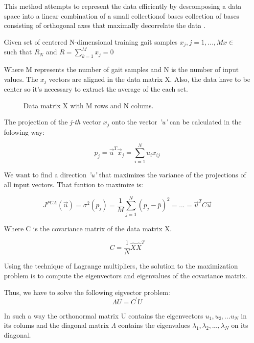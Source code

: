 This method attempts to represent the data efficiently by descomposing a data space into a linear combination of a small collectionof bases collection of bases consisting of orthogonal axes that maximally decorrelate the data \cite{Jeon}.

Given  set of centered N-dimensional training gait samples 
$ x_{j}, j=1,...,M     x \in$ such that $ R_{N} $ and $ R=\sum_{k=1}^{M}x_{j}=0 $
	
Where M represents the number of gait samples and N is the number of input values. The $ x_{j} $ vectors are aligned in the data matrix X. Also, the data have to be center so it's necessary to extract the average of the each set.
\begin{figure}[H]
	\centering
	\caption{Data matrix X with M rows and N colums.}
	\label{fig:matrixPCA}
\end{figure}

The projection of the \textit{j-th} vector $ x_{j} $ onto the vector \textit{'u'} can be calculated in the folowing way:

\begin{equation}
	\label{projections}
	p_{j}=\overrightarrow{u}^{T}\overrightarrow{x}_{j}=\sum_{i=1}^{N}u_{i}x_{ij}	
\end{equation}

We want to find a direction \textit{'u'} that maximizes the variance of the projections of all input vectors. That funtion to maximize is:

\begin{equation}
	\label{maxfunction}
	J^{PCA}(\overrightarrow{u})=\sigma^{2}(p_{j})=\dfrac{1}{M}\sum_{j=1}^{N}(p_{j}-\bar{p})^{2}=...=\overrightarrow{u}^{T}C\overrightarrow{u}	
\end{equation}

Where C is the covariance matrix of the data matrix X.

$$C=\dfrac{1}{N}\hat{X}\hat{X}^{T}$$

Using the technique of Lagrange multipliers, the solution to the maximization problem is to compute the eigenvectors and eigenvalues of the covariance matrix.

Thus, we have to solve the following eigvector problem:
\begin{equation}
	\label{eigenproblem}
	\Lambda U=C^{'} U
\end{equation}

In such a way the orthonormal matrix U contains the eigenvectors $u_{1}, u_{2},...u_{N}$ in its colums and the diagonal matrix $\Lambda$ contains the eigenvalues $\lambda_{1}, \lambda_{2},...,\lambda_{N}$ on its diagonal.


